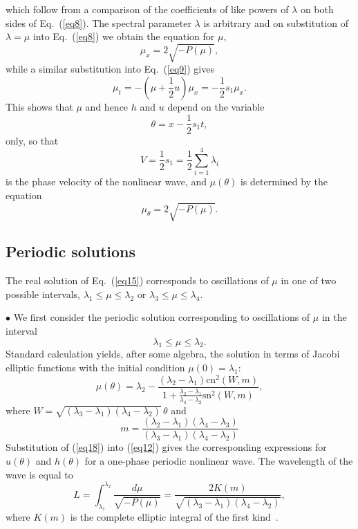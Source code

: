 \documentclass[pre,aps,superscriptaddress,twocolumn,floatfix]{revtex4-1}
\newcommand{\la}{\lambda}
\newcommand{\sn}{\mathrm{sn}}
\newcommand{\cn}{\mathrm{cn}}
\begin{document}
which follow from a comparison of the coefficients of like
powers of $\lambda$ on both sides of Eq.~(\ref{eq8}). The spectral
parameter $\lambda $ is arbitrary and on substitution of $\lambda =\mu$
into Eq.~(\ref{eq8}) we obtain the equation for $\mu $,
$$
\mu_{x}=2\sqrt{- P(\mu )},
$$
while a similar substitution into Eq.~(\ref{eq9}) gives
$$
\mu_{t}=-\left(\mu +\frac{1}{2}u\right)\mu _{x}=-\frac{1}{2}s_{1}\mu _{x}.
$$
This shows that $\mu$ and hence $h$ and $u$ depend on the variable
\begin{equation}\label{eq13}
\theta =x-\frac{1}{2}s_{1}t,
\end{equation}
only, so that
\begin{equation}\label{eq14}
V=\frac12 s_1=\frac12\sum_{i=1}^4\la_i
\end{equation}
is the phase velocity of the nonlinear wave,
and $\mu (\theta )$ is determined by the equation
\begin{equation}\label{eq15}
\mu _{\theta }=2\sqrt{ -P(\mu )}.
\end{equation}

\subsection{Periodic solutions}

The real solution of Eq.~(\ref{eq15}) corresponds to oscillations of $\mu$ in one of two
possible intervals,
$\la_1\leq\mu\leq\la_2$
or $\la_3\leq\mu\leq\la_4$.

$\bullet$  We first consider the periodic solution corresponding to oscillations
of $\mu$ in the interval
\begin{equation}\label{eq17}
\la_1\leq\mu\leq\la_2.
\end{equation}
Standard calculation yields, after some algebra, the solution in terms of
Jacobi elliptic functions with the initial condition
$\mu(0)=\la_1$:
\begin{equation}\label{eq18}
\mu(\theta)=\la_2-
\frac{(\la_2-\la_1)
	\cn^2\left(W,m\right)}
{1+\frac{\la_2-\la_1}{\la_4-\la_2}
	\sn^2\left(W, m \right)},
\end{equation}
where $W=\sqrt{(\la_3-\la_1)(\la_4-\la_2)}\,\theta$ and
\begin{equation}\label{eq19}
m=\frac{(\la_2-\la_1)(\la_4-\la_3)}{(\la_3-\la_1)(\la_4-\la_2)}
\end{equation}
Substitution of (\ref{eq18}) into (\ref{eq12}) gives the corresponding
expressions for $u(\theta)$ and $h(\theta)$ for a one-phase periodic
nonlinear wave. The wavelength of the wave is equal to
\begin{equation}\label{eq20}
L=\int_{\la_1}^{\la_2}\frac{d\mu}{\sqrt{-P(\mu)}}=
\frac{2K(m)}{\sqrt{(\la_3-\la_1)(\la_4-\la_2)}},
\end{equation}
where $K(m)$ is the complete elliptic integral of the first
kind~\cite{AbramowitzStegun-1972}.
\end{document}
